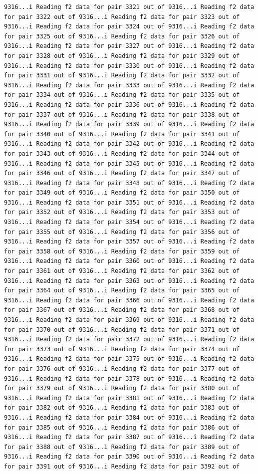 \documentclass[
]{article}
\begin{document}
\begin{verbatim}
9316...i Reading f2 data for pair 3321 out of 9316...i Reading f2 data for pair 3322 out of 9316...i Reading f2 data for pair 3323 out of 9316...i Reading f2 data for pair 3324 out of 9316...i Reading f2 data for pair 3325 out of 9316...i Reading f2 data for pair 3326 out of 9316...i Reading f2 data for pair 3327 out of 9316...i Reading f2 data for pair 3328 out of 9316...i Reading f2 data for pair 3329 out of 9316...i Reading f2 data for pair 3330 out of 9316...i Reading f2 data for pair 3331 out of 9316...i Reading f2 data for pair 3332 out of 9316...i Reading f2 data for pair 3333 out of 9316...i Reading f2 data for pair 3334 out of 9316...i Reading f2 data for pair 3335 out of 9316...i Reading f2 data for pair 3336 out of 9316...i Reading f2 data for pair 3337 out of 9316...i Reading f2 data for pair 3338 out of 9316...i Reading f2 data for pair 3339 out of 9316...i Reading f2 data for pair 3340 out of 9316...i Reading f2 data for pair 3341 out of 9316...i Reading f2 data for pair 3342 out of 9316...i Reading f2 data for pair 3343 out of 9316...i Reading f2 data for pair 3344 out of 9316...i Reading f2 data for pair 3345 out of 9316...i Reading f2 data for pair 3346 out of 9316...i Reading f2 data for pair 3347 out of 9316...i Reading f2 data for pair 3348 out of 9316...i Reading f2 data for pair 3349 out of 9316...i Reading f2 data for pair 3350 out of 9316...i Reading f2 data for pair 3351 out of 9316...i Reading f2 data for pair 3352 out of 9316...i Reading f2 data for pair 3353 out of 9316...i Reading f2 data for pair 3354 out of 9316...i Reading f2 data for pair 3355 out of 9316...i Reading f2 data for pair 3356 out of 9316...i Reading f2 data for pair 3357 out of 9316...i Reading f2 data for pair 3358 out of 9316...i Reading f2 data for pair 3359 out of 9316...i Reading f2 data for pair 3360 out of 9316...i Reading f2 data for pair 3361 out of 9316...i Reading f2 data for pair 3362 out of 9316...i Reading f2 data for pair 3363 out of 9316...i Reading f2 data for pair 3364 out of 9316...i Reading f2 data for pair 3365 out of 9316...i Reading f2 data for pair 3366 out of 9316...i Reading f2 data for pair 3367 out of 9316...i Reading f2 data for pair 3368 out of 9316...i Reading f2 data for pair 3369 out of 9316...i Reading f2 data for pair 3370 out of 9316...i Reading f2 data for pair 3371 out of 9316...i Reading f2 data for pair 3372 out of 9316...i Reading f2 data for pair 3373 out of 9316...i Reading f2 data for pair 3374 out of 9316...i Reading f2 data for pair 3375 out of 9316...i Reading f2 data for pair 3376 out of 9316...i Reading f2 data for pair 3377 out of 9316...i Reading f2 data for pair 3378 out of 9316...i Reading f2 data for pair 3379 out of 9316...i Reading f2 data for pair 3380 out of 9316...i Reading f2 data for pair 3381 out of 9316...i Reading f2 data for pair 3382 out of 9316...i Reading f2 data for pair 3383 out of 9316...i Reading f2 data for pair 3384 out of 9316...i Reading f2 data for pair 3385 out of 9316...i Reading f2 data for pair 3386 out of 9316...i Reading f2 data for pair 3387 out of 9316...i Reading f2 data for pair 3388 out of 9316...i Reading f2 data for pair 3389 out of 9316...i Reading f2 data for pair 3390 out of 9316...i Reading f2 data for pair 3391 out of 9316...i Reading f2 data for pair 3392 out of 
\end{verbatim}
\end{document}
